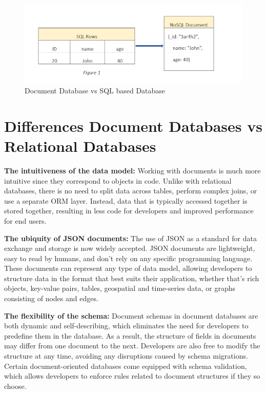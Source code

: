 \begin{figure}[H]
    \centering
    \caption{Document Database vs SQL based Database} \label{fig:Software pricing Overview}
    \includegraphics[width=1.0\textwidth]{images/Document_Database.png}
\end{figure}

\section{Differences Document Databases vs Relational Databases}

\textbf{The intuitiveness of the data model:} Working with documents is much more intuitive since they correspond to objects in code. Unlike with relational databases, there is no need to split data across tables, perform complex joins, or use a separate \ac{ORM} layer. Instead, data that is typically accessed together is stored together, resulting in less code for developers and improved performance for end users.

\textbf{The ubiquity of JSON documents:} The use of \ac{JSON} as a standard for data exchange and storage is now widely accepted. \ac{JSON} documents are lightweight, easy to read by humans, and don't rely on any specific programming language. These documents can represent any type of data model, allowing developers to structure data in the format that best suits their application, whether that's rich objects, key-value pairs, tables, geospatial and time-series data, or graphs consisting of nodes and edges.

\textbf{The flexibility of the schema:} Document schemas in document databases are both dynamic and self-describing, which eliminates the need for developers to predefine them in the database. As a result, the structure of fields in documents may differ from one document to the next. Developers are also free to modify the structure at any time, avoiding any disruptions caused by schema migrations. Certain document-oriented databases come equipped with schema validation, which allows developers to enforce rules related to document structures if they so choose.

